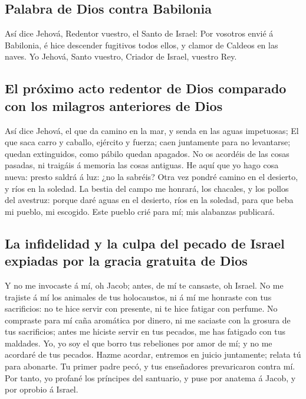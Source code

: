 \hypertarget{palabra-de-dios-contra-babilonia}{%
\subsection{Palabra de Dios contra
Babilonia}\label{palabra-de-dios-contra-babilonia}}

 Así dice Jehová, Redentor vuestro, el Santo de Israel: Por
vosotros envié á Babilonia, é hice descender fugitivos todos ellos, y
clamor de Caldeos en las naves.  Yo Jehová, Santo vuestro,
Criador de Israel, vuestro Rey.

\hypertarget{el-pruxf3ximo-acto-redentor-de-dios-comparado-con-los-milagros-anteriores-de-dios}{%
\subsection{El próximo acto redentor de Dios comparado con los milagros
anteriores de
Dios}\label{el-pruxf3ximo-acto-redentor-de-dios-comparado-con-los-milagros-anteriores-de-dios}}

 Así dice Jehová, el que da camino en la mar, y senda en
las aguas impetuosas;  El que saca carro y caballo,
ejército y fuerza; caen juntamente para no levantarse; quedan
extinguidos, como pábilo quedan apagados.  No os acordéis
de las cosas pasadas, ni traigáis á memoria las cosas antiguas.
 He aquí que yo hago cosa nueva: presto saldrá á luz: ¿no
la sabréis? Otra vez pondré camino en el desierto, y ríos en la soledad.
 La bestia del campo me honrará, los chacales, y los pollos
del avestruz: porque daré aguas en el desierto, ríos en la soledad, para
que beba mi pueblo, mi escogido.  Este pueblo crié para mí;
mis alabanzas publicará.

\hypertarget{la-infidelidad-y-la-culpa-del-pecado-de-israel-expiadas-por-la-gracia-gratuita-de-dios}{%
\subsection{La infidelidad y la culpa del pecado de Israel expiadas por
la gracia gratuita de
Dios}\label{la-infidelidad-y-la-culpa-del-pecado-de-israel-expiadas-por-la-gracia-gratuita-de-dios}}

 Y no me invocaste á mí, oh Jacob; antes, de mí te
cansaste, oh Israel.  No me trajiste á mí los animales de
tus holocaustos, ni á mí me honraste con tus sacrificios: no te hice
servir con presente, ni te hice fatigar con perfume.  No
compraste para mí caña aromática por dinero, ni me saciaste con la
grosura de tus sacrificios; antes me hiciste servir en tus pecados, me
has fatigado con tus maldades.  Yo, yo soy el que borro tus
rebeliones por amor de mí; y no me acordaré de tus pecados.
 Hazme acordar, entremos en juicio juntamente; relata tú
para abonarte.  Tu primer padre pecó, y tus enseñadores
prevaricaron contra mí.  Por tanto, yo profané los
príncipes del santuario, y puse por anatema á Jacob, y por oprobio á
Israel.

